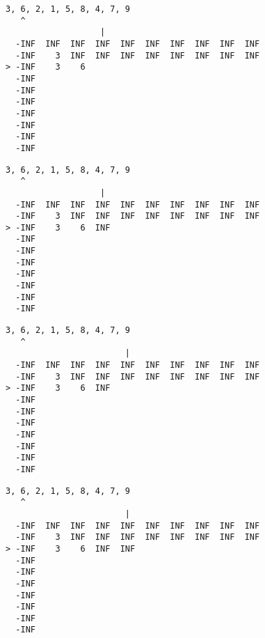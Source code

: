 { \begin{verbatim}
3, 6, 2, 1, 5, 8, 4, 7, 9
   ^
                   |
  -INF  INF  INF  INF  INF  INF  INF  INF  INF  INF
  -INF    3  INF  INF  INF  INF  INF  INF  INF  INF
> -INF    3    6                                   
  -INF                                             
  -INF                                             
  -INF                                             
  -INF                                             
  -INF                                             
  -INF                                             
  -INF                                             
\end{verbatim} }

{ \begin{verbatim}
3, 6, 2, 1, 5, 8, 4, 7, 9
   ^
                   |
  -INF  INF  INF  INF  INF  INF  INF  INF  INF  INF
  -INF    3  INF  INF  INF  INF  INF  INF  INF  INF
> -INF    3    6  INF                              
  -INF                                             
  -INF                                             
  -INF                                             
  -INF                                             
  -INF                                             
  -INF                                             
  -INF                                             
\end{verbatim} }

{ \begin{verbatim}
3, 6, 2, 1, 5, 8, 4, 7, 9
   ^
                        |
  -INF  INF  INF  INF  INF  INF  INF  INF  INF  INF
  -INF    3  INF  INF  INF  INF  INF  INF  INF  INF
> -INF    3    6  INF                              
  -INF                                             
  -INF                                             
  -INF                                             
  -INF                                             
  -INF                                             
  -INF                                             
  -INF                                             
\end{verbatim} }

{ \begin{verbatim}
3, 6, 2, 1, 5, 8, 4, 7, 9
   ^
                        |
  -INF  INF  INF  INF  INF  INF  INF  INF  INF  INF
  -INF    3  INF  INF  INF  INF  INF  INF  INF  INF
> -INF    3    6  INF  INF                         
  -INF                                             
  -INF                                             
  -INF                                             
  -INF                                             
  -INF                                             
  -INF                                             
  -INF                                             
\end{verbatim} }

